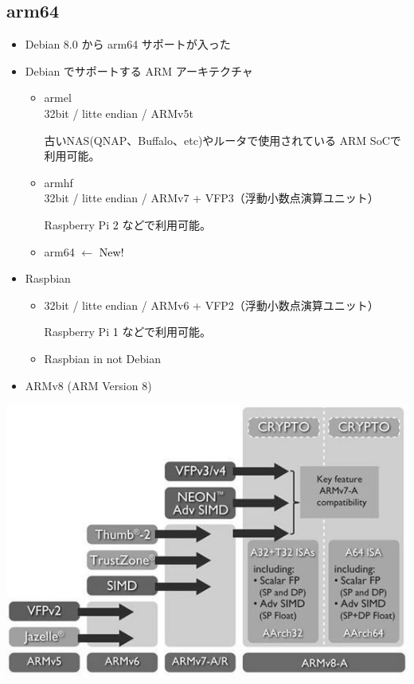 \documentclass[mingoth,a4paper]{jsarticle}
\begin{document}
  \subsection{arm64}
  \begin{itemize}
  \item Debian 8.0 から arm64 サポートが入った
  \item Debian でサポートする ARM アーキテクチャ
　\begin{itemize}
  \item armel\\
  32bit / litte endian / ARMv5t

  古いNAS(QNAP、Buffalo、etc)やルータで使用されている ARM SoCで利用可能。

  \item armhf\\
  32bit / litte endian / ARMv7 + VFP3（浮動小数点演算ユニット）

  Raspberry Pi \textcolor{black}{2} などで利用可能。

  \item arm64 $\leftarrow$ \textcolor{black}{New!}

  \end{itemize}

  \item Raspbian

  \begin{itemize}
  \item 32bit / litte endian / ARMv6 + VFP2（浮動小数点演算ユニット）

       Raspberry Pi \textcolor{black}{1} などで利用可能。
  \item Raspbian in not Debian

  \end{itemize}

  \end{itemize}

  \begin{itemize}
  \item ARMv8 (ARM Version 8)
  \end{itemize}
  \begin{center}
  \includegraphics[width=0.7\hsize]{image201511/V5_to_V8_Architecture_mono.jpg}
  \end{center}
\end{document}
